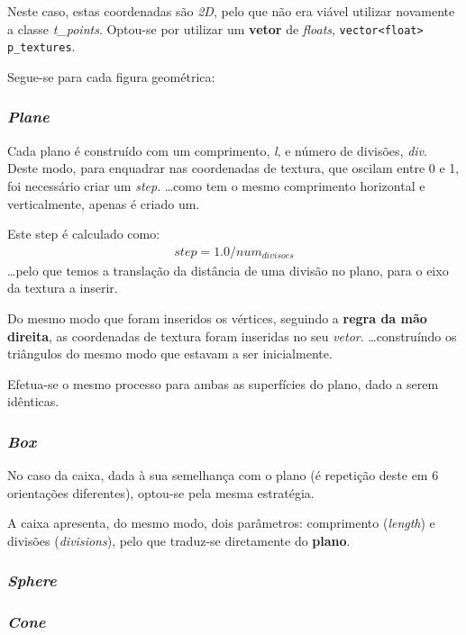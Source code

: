 \documentclass[relatorio.tex]{subfiles}
\begin{document}
Neste caso, estas coordenadas são \textit{2D}, pelo que
não era viável utilizar novamente a classe \textit{t\_points}.
Optou-se por utilizar um \textbf{vetor} de \textit{floats},
\texttt{vector<float> p_textures}.

Segue-se para cada figura geométrica:
\subsubsection{\textit{Plane}}

Cada plano é construído com um comprimento, \textit{l}, 
e número de divisões, \textit{div}.
Deste modo, para enquadrar nas coordenadas de textura,
que oscilam entre 0 e 1, foi necessário criar 
um \textit{step}.
\dots como tem o mesmo comprimento horizontal e 
verticalmente, apenas é criado um.

Este step é calculado como:
\begin{eqnarray}
    step = 1.0 / num_{divisoes}
\end{eqnarray}
\dots pelo que temos a translação da distância de uma
divisão no plano, para o eixo da textura a inserir.

Do mesmo modo que foram inseridos os vértices,
seguindo a \textbf{regra da mão direita}, 
as coordenadas de textura foram inseridas no seu \textit{vetor}.
\dots construíndo os triângulos do mesmo 
modo que estavam a ser inicialmente.

Efetua-se o mesmo processo para ambas as 
superfícies do plano, dado a serem 
idênticas.

\subsubsection{\textit{Box}}

No caso da caixa, dada à sua semelhança com o plano 
(é repetição deste em 6 orientações diferentes),
optou-se pela mesma estratégia.

A caixa apresenta, do mesmo modo, dois parâmetros: comprimento (\textit{length})
e divisões (\textit{divisions}), pelo que traduz-se 
diretamente do \textbf{plano}.

\subsubsection{\textit{Sphere}}

\subsubsection{\textit{Cone}}
\end{document}

